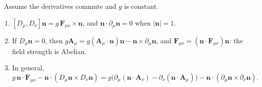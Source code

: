 \begin{theorem}\label{thm:thooft}\ver\
Assume the derivatives commute and $g$ is constant.
\begin{enumerate}[label=(\roman*)]
\item $[D_\mu,D_\nu]\mathbf n=g\,\mathbf F_{\mu\nu}\times\mathbf n$, and $\mathbf n\cdot\partial_\mu\mathbf n=0$ when $|\mathbf n|=1$.
\item If $D_\mu\mathbf n=0$, then $g\mathbf A_\mu=g(\mathbf A_\mu\cdot\mathbf n)\mathbf n-\mathbf n\times\partial_\mu\mathbf n$, and $\mathbf F_{\mu\nu}=(\mathbf n\cdot\mathbf F_{\mu\nu})\mathbf n$: the field strength is Abelian.
\item In general,
\[
g\,\mathbf n\cdot\mathbf F_{\mu\nu}-\mathbf n\cdot(D_\mu\mathbf n\times D_\nu\mathbf n)=g\bigl(\partial_\mu(\mathbf n\cdot\mathbf A_\nu)-\partial_\nu(\mathbf n\cdot\mathbf A_\mu)\bigr)-\mathbf n\cdot(\partial_\mu\mathbf n\times\partial_\nu\mathbf n).
\]
\end{enumerate}
\end{theorem}
